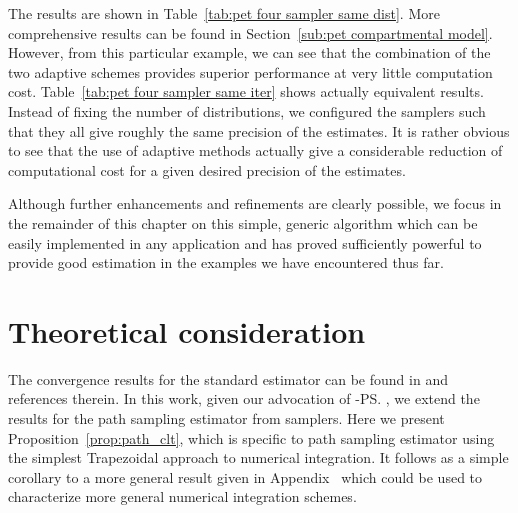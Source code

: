 

The results are shown in Table~\ref{tab:pet four sampler same dist}. More
comprehensive results can be found in Section~\ref{sub:pet compartmental
  model}. However, from this particular example, we can see that the
combination of the two adaptive schemes provides superior performance at very
little computation cost. Table~\ref{tab:pet four sampler same iter} shows
actually equivalent results. Instead of fixing the number of distributions, we
configured the samplers such that they all give roughly the same precision of
the estimates. It is rather obvious to see that the use of adaptive methods
actually give a considerable reduction of computational cost for a given
desired precision of the estimates.



Although further enhancements and refinements are clearly possible, we focus
in the remainder of this chapter on this simple, generic algorithm which can
be easily implemented in any application and has proved sufficiently powerful
to provide good estimation in the examples we have encountered thus far.

\section{Theoretical consideration}
\label{sec:Theoretical considerations}

The convergence results for the standard estimator can be found in
\cite{DelMoral:2006hc} and references therein. In this work, given our
advocation of \smc[2]-\ps, we extend the results for the path sampling
estimator from \smc samplers. Here we present Proposition~\ref{prop:path_clt},
which is specific to path sampling estimator using the simplest Trapezoidal
approach to numerical integration. It follows as a simple corollary to a more
general result given in Appendix~ which
could be used to characterize more general numerical integration schemes.

